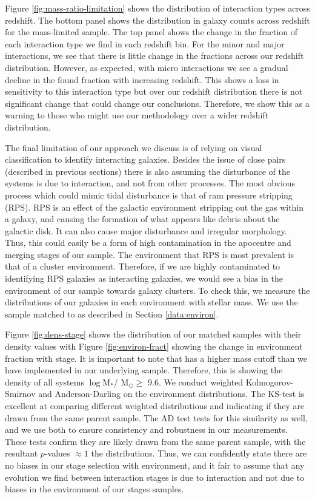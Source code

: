 Figure \ref{fig:mass-ratio-limitation} shows the distribution of interaction types across redshift. The bottom panel shows the distribution in galaxy counts across redshift for the mass-limited sample. The top panel shows the change in the fraction of each interaction type we find in each redshift bin. For the minor and major interactions, we see that there is little change in the fractions across our redshift distribution. However, as expected, with micro interactions we see a gradual decline in the found fraction with increasing redshift. This shows a loss in sensitivity to this interaction type but over our redshift distribution there is not significant change that could change our conclusions. Therefore, we show this as a warning to those who might use our methodology over a wider redshift distribution.

The final limitation of our approach we discuss is of relying on visual classification to identify interacting galaxies. Besides the issue of close pairs (described in previous sections) there is also assuming the disturbance of the systems is due to interaction, and not from other processes. The most obvious process which could mimic tidal disturbance is that of ram pressure stripping (RPS). RPS is an effect of the galactic environment stripping out the gas within a galaxy, and causing the formation of what appears like debris about the galactic disk. It can also cause major disturbance and irregular morphology. Thus, this could easily be a form of high contamination in the apocentre and merging stages of our sample. The environment that RPS is most prevalent is that of a cluster environment. Therefore, if we are highly contaminated to identifying RPS galaxies as interacting galaxies, we would see a bias in the environment of our sample towards galaxy clusters. To check this, we measure the distributions of our galaxies in each environment with stellar mass. We use the sample matched to \citet{2017ApJ...837...16D} as described in Section \ref{data:environ}.

Figure \ref{fig:dens-stage} shows the distribution of our matched samples with their density values with Figure \ref{fig:environ-fract} showing the change in environment fraction with stage. It is important to note that \citet{2017ApJ...837...16D} has a higher mass cutoff than we have implemented in our underlying sample. Therefore, this is showing the density of all systems $\log$M$_*$/ M$_\odot \geq$ 9.6. We conduct weighted Kolmogorov-Smirnov \citep[KS-test;][]{an1933sulla} and Anderson-Darling \citep[AD-test;][]{stephens_74} on the environment distributions. The KS-test is excellent at comparing different weighted distributions and indicating if they are drawn from the same parent sample. The AD test tests for this similarity as well, and we use both to ensure consistency and robustness in our measurements. These tests confirm they are likely drawn from the same parent sample, with the resultant $p$-values $\approx1$ the distributions. Thus, we can confidently state there are no biases in our stage selection with environment, and it fair to assume that any evolution we find between interaction stages is due to interaction and not due to biases in the environment of our stages samples.

